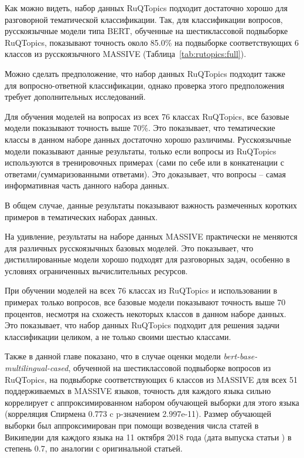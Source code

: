 Как можно видеть, набор данных {RuQTopics} подходит достаточно хорошо для разговорной тематической классификации. Так, для классификации вопросов, русскоязычные модели типа BERT, обученные на шестиклассовой подвыборке {RuQTopics}, показывают точность около 85.0\% на подвыборке соответствующих 6 классов из русскоязычного {MASSIVE} (Таблица~\ref{tab:rutopics:full}).

Можно сделать предположение, что набор данных {RuQTopics} подходит также для вопросно-ответной классификации, однако проверка этого предположения требует дополнительных исследований.

Для обучения моделей на вопросах из всех 76 классах {RuQTopics}, все базовые модели показывают точность выше 70\%. Это показывает, что тематические классы в данном наборе данных достаточно хорошо различимы.
Русскоязычные модели показывают данные результаты, только если вопросы из  {RuQTopics} используются в тренировочных примерах (сами по себе или в конкатенации с ответами/суммаризованными ответами). Это доказывает, что вопросы -- самая информативная часть данного набора данных.

В общем случае, данные результаты показывают важность размеченных коротких примеров в тематических наборах данных. 

На удивление, результаты на наборе данных {MASSIVE} практически не меняются для различных русскоязычных базовых моделей. Это показывает, что дистиллированные модели хорошо подходят для разговорных задач, особенно в условиях ограниченных вычислительных ресурсов.

При обучении моделей на всех 76 классах из {RuQTopics} и использовании в примерах только вопросов, все базовые модели показывают точность выше 70 процентов, несмотря на схожесть некоторых классов в данном наборе данных. Это показывает, что набор данных {RuQTopics} подходит для решения задачи классификации целиком, а не только своими шестью классами.

Также в данной главе показано, что в случае оценки модели  \textit{bert-base-multilingual-cased}, обученной на шестиклассовой подвыборке вопросов из {RuQTopics}, на подвыборке соответствующих 6 классов из {MASSIVE} для всех 51 поддерживаемых в {MASSIVE} языков, точность для каждого языка сильно коррелирует с аппроксимированном набором обучающей выборки для этого языка (корреляция Спирмена 0.773 c p-значением 2.997e-11). Размер обучающей выборки был аппроксимирован при помощи возведения числа статей в Википедии для каждого языка на 11 октября 2018 года (дата выпуска статьи \cite{bert}) в степень 0.7, по аналогии с оригинальной статьей. 

